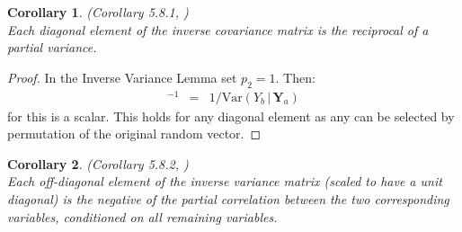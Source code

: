 \documentclass[a4paper]{article}
\theoremstyle{myexamplestyle}
\newtheorem{coro}{Corollary}
\begin{document}
\begin{coro} (Corollary 5.8.1, \cite{Whit1990} )
\\
Each diagonal element of the inverse covariance matrix is the reciprocal of a partial variance. 
\end{coro}
\begin{proof}
In the Inverse Variance Lemma set $p_2 = 1$. Then:
\begin{eqnarray*}
[\mbox{Var}(Y_b \, | \, \mathbf{Y}_a)]^{-1} & = & 1 / \mbox{Var}(Y_b \, | \, \mathbf{Y}_a)
\end{eqnarray*}
for this is a scalar. This holds for any diagonal element as any can be selected by permutation of the original random vector.
\end{proof}



\begin{coro} (Corollary 5.8.2, \cite{Whit1990} ) \label{coro.partCorInvCov}
\\
Each off-diagonal element of the inverse variance matrix (scaled to have a unit diagonal) is the negative of the partial correlation between the two corresponding variables, conditioned on all remaining variables.
\end{coro}
\end{document}
